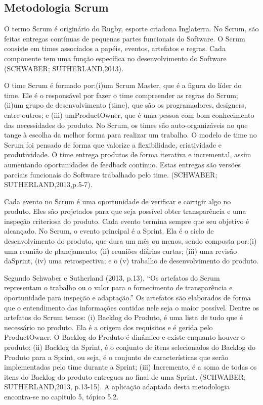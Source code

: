 \subsection{Metodologia Scrum}

O termo Scrum  é originário do Rugby, esporte criadona Inglaterra. No Scrum, são feitas entregas contínuas de pequenas partes funcionais do Software. O Scrum consiste em times associados a papéis, eventos, artefatos e regras. Cada componente tem uma função específica no desenvolvimento do Software (SCHWABER; SUTHERLAND,2013).

O time Scrum é formado por:(i)um Scrum Master, que é a figura do líder do time. Ele é o responsável por fazer o time compreender as regras do Scrum; (ii)um grupo de desenvolvimento (time), que são os programadores, designers, entre outros; e (iii) umProductOwner, que é uma pessoa com bom conhecimento das necessidades do produto. No Scrum, os times são auto-organizáveis no que tange à escolha da melhor forma para realizar um trabalho. O modelo de time no Scrum foi pensado de forma que valorize a flexibilidade, criatividade e produtividade.  O time entrega produtos de forma iterativa e incremental, assim aumentando oportunidades de feedback contínuo. Estas entregas são versões parciais funcionais do Software trabalhado pelo time. (SCHWABER; SUTHERLAND,2013,p.5-7).

Cada evento no Scrum é uma oportunidade de verificar e corrigir algo no produto. Eles são projetados para que seja possível obter transparência e uma inspeção criteriosa do produto. Cada evento termina sempre que seu objetivo é alcançado. No Scrum, o evento principal é a Sprint. Ela é o ciclo de desenvolvimento do produto, que dura um mês ou menos, sendo composta por:(i) uma reunião de planejamento; (ii) reuniões diárias curtas; (iii) uma revisão daSprint, (iv) uma retrospectiva; e o  (v) trabalho de desenvolvimento do produto.

Segundo Schwaber e Sutherland (2013, p.13), “Os artefatos do Scrum representam o trabalho ou o valor para o fornecimento de transparência e oportunidade para inspeção e adaptação.” Os artefatos são elaborados de forma que o entendimento das informações contidas nele seja o maior possível. Dentre os artefatos do Scrum temos: (i) Backlog do Produto, é uma lista de tudo que é necessário no produto. Ela é a origem dos requisitos e é gerida pelo ProductOwner. O Backlog do Produto é dinâmico e existe enquanto houver o produto; (ii) Backlog da Sprint, é o conjunto de itens selecionados do Backlog do Produto para a Sprint, ou seja, é o conjunto de características que serão implementadas pelo time durante a Sprint; (iii) Incremento, é a soma de todas os itens do Backlog do produto entregues no final de uma Sprint. (SCHWABER; SUTHERLAND,2013, p.13-15). A aplicação adaptada desta metodologia encontra-se no capitulo 5, tópico 5.2.


